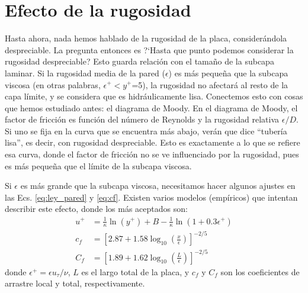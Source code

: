 \section*{Efecto de la rugosidad}

Hasta ahora, nada hemos hablado de la rugosidad de la placa, considerándola despreciable.
La pregunta entonces es \mbox{?`}Hasta que punto podemos considerar la rugosidad despreciable? Esto guarda relación con el tamaño de la subcapa laminar.
Si la rugosidad media de la pared ($\epsilon$) es más pequeña que la subcapa viscosa (en otras palabras, $\epsilon^+<y^+$=5), la rugosidad no afectará al resto de la capa límite, y se considera que es hidráulicamente lisa.
Conectemos esto con cosas que hemos estudiado antes: el diagrama de Moody.
En el diagrama de Moody, el factor de fricción es función del número de Reynolds y la rugosidad relativa $\epsilon/D$.
Si uno se fija en la curva que se encuentra más abajo, verán que dice ``tubería lisa'', es decir, con rugosidad despreciable. 
Esto es exactamente a lo que se refiere esa curva, donde el factor de fricción no se ve influenciado por la rugosidad, pues es más pequeña que el límite de la subcapa viscosa.

Si $\epsilon$ es más grande que la subcapa viscosa, necesitamos hacer algunos ajustes en las Ecs. \eqref{eq:ley_pared} y \eqref{eq:cf}.
Existen varios modelos (empíricos) que intentan describir este efecto, donde los más aceptados son:
%
\begin{align}
u^+ &= \frac{1}{\kappa} \ln(y^+) + B - \frac{1}{\kappa}\ln(1+0.3\epsilon^+)\nonumber\\
c_f &= \left[2.87+1.58\log_{10}\left(\frac{x}{\epsilon}\right)\right]^{-2/5}\nonumber\\
C_f &= \left[1.89+1.62\log_{10}\left(\frac{L}{\epsilon}\right)\right]^{-2/5}
\end{align}
%
donde $\epsilon^+ =\epsilon u_\tau/\nu$, $L$ es el largo total de la placa, y $c_f$ y $C_f$ son los coeficientes de arrastre local y total, respectivamente.
